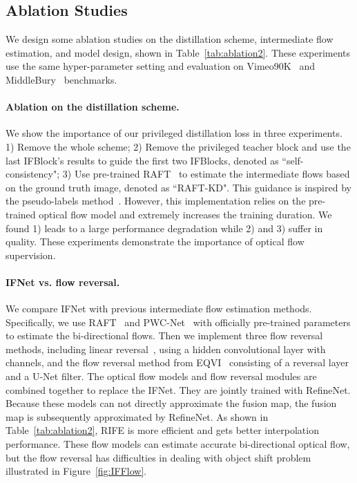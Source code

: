 \documentclass[final]{cvpr}
\begin{document}
\subsection{Ablation Studies}
\label{sec:model_ablation}



We design some ablation studies on the distillation scheme, intermediate flow estimation, and model design, shown in Table~\ref{tab:ablation2}. These experiments use the same hyper-parameter setting and evaluation on Vimeo90K~\cite{xue2019video} and MiddleBury~\cite{baker2011database} benchmarks. 

\paragraph{Ablation on the distillation scheme.} We show the importance of our privileged distillation loss in three experiments. 1) Remove the whole scheme; 2) Remove the privileged teacher block and use the last IFBlock’s results to guide the first two IFBlocks, denoted as ``self-consistency"; 3) Use pre-trained RAFT~\cite{teed2020raft} to estimate the intermediate flows based on the ground truth image, denoted as ``RAFT-KD". This guidance is inspired by the pseudo-labels method~\cite{lee2013pseudo}. However, this implementation relies on the pre-trained optical flow model and extremely increases the training duration. We found 1) leads to a large performance degradation while 2) and 3) suffer in quality. These experiments demonstrate the importance of optical flow supervision.
\paragraph{IFNet vs. flow reversal.}

We compare IFNet with previous intermediate flow estimation methods. Specifically, we use RAFT~\cite{teed2020raft} and PWC-Net~\cite{sun2018pwc} with officially pre-trained parameters to estimate the bi-directional flows. Then we implement three flow reversal methods, including linear reversal~\cite{jiang2018super}, using a hidden convolutional layer with  channels, and the flow reversal method from EQVI~\cite{liu2020enhanced} consisting of a reversal layer and a U-Net filter. The optical flow models and flow reversal modules are combined together to replace the IFNet. They are jointly trained with RefineNet. Because these models can not directly approximate the fusion map, the fusion map is subsequently approximated by RefineNet. As shown in Table~\ref{tab:ablation2}, RIFE is more efficient and gets better interpolation performance. These flow models can estimate accurate bi-directional optical flow, but the flow reversal has difficulties in dealing with object shift problem illustrated in Figure~\ref{fig:IFFlow}. 
\end{document}
